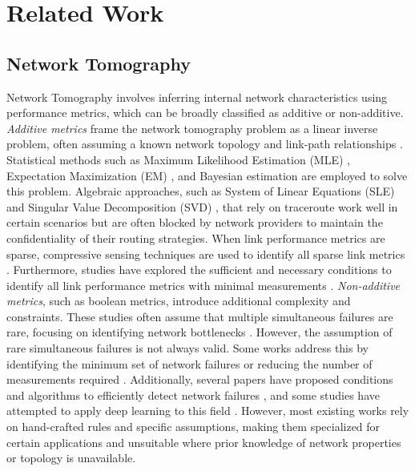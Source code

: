 \section{Related Work}
\label{sec:related work}

\subsection{Network Tomography}
Network Tomography involves inferring internal network characteristics using performance metrics, which can be broadly classified as additive or non-additive. \textit{Additive metrics} frame the network tomography problem as a linear inverse problem, often assuming a known network topology and link-path relationships \citep{gurewitz2001estimating,liang2003maximum,chen2010network}. Statistical methods such as Maximum Likelihood Estimation (MLE) \citep{wandong2011research,teng2024learning}, Expectation Maximization (EM) \citep{bu2002network,wei2007mobile,wandong2011research}, and Bayesian estimation \citep{zhang2006origin,wandong2011research} are employed to solve this problem. Algebraic approaches, such as System of Linear Equations (SLE) \citep{bejerano2003robust,chen2003tomography,gopalan2011identifying} and Singular Value Decomposition (SVD) \citep{chua2005efficient,song2008netquest}, that rely on traceroute work well in certain scenarios but are often blocked by network providers to maintain the confidentiality of their routing strategies. When link performance metrics are sparse, compressive sensing techniques are used to identify all sparse link metrics \citep{firooz2010network,xu2011compressive}. Furthermore, studies have explored the sufficient and necessary conditions to identify all link performance metrics with minimal measurements \citep{gopalan2011identifying,alon2014economical}. \textit{Non-additive metrics}, such as boolean metrics, introduce additional complexity and constraints. These studies often assume that multiple simultaneous failures are rare, focusing on identifying network bottlenecks \citep{bejerano2003robust,horton2003number}. However, the assumption of rare simultaneous failures is not always valid. Some works address this by identifying the minimum set of network failures or reducing the number of measurements required \citep{duffield2006network,zeng2012automatic,ikeuchi2022network}. Additionally, several papers have proposed conditions and algorithms to efficiently detect network failures \citep{he2018distributed,nicola2018tight,bartolini2020fundamental,ibraheem2023network}, and some studies have attempted to apply deep learning to this field \citep{ma2020neural, sartzetakis2022machine, tao2023network}. However, most existing works rely on hand-crafted rules and specific assumptions, making them specialized for certain applications and unsuitable where prior knowledge of network properties or topology is unavailable.


